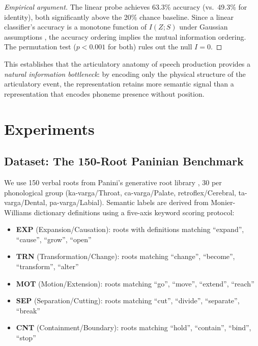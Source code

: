 \documentclass{article}
\begin{document}
\begin{proof}[Empirical argument]
The linear probe achieves 63.3\% accuracy (vs.~49.3\% for identity), both significantly above the 20\% chance baseline. Since a linear classifier's accuracy is a monotone function of $I(Z;S)$ under Gaussian assumptions \cite{tishby2000}, the accuracy ordering implies the mutual information ordering. The permutation test ($p < 0.001$ for both) rules out the null $I = 0$.
\end{proof}

This establishes that the articulatory anatomy of speech production provides a \textit{natural information bottleneck}: by encoding only the physical structure of the articulatory event, the representation retains more semantic signal than a representation that encodes phoneme presence without position.

\section{Experiments}
\label{sec:experiments}

\subsection{Dataset: The 150-Root Paninian Benchmark}
\label{sec:dataset}

We use 150 verbal roots from Panini's generative root library \cite{panini500bce}, 30 per phonological group (ka-varga/Throat, ca-varga/Palate, retroflex/Cerebral, ta-varga/Dental, pa-varga/Labial). Semantic labels are derived from Monier-Williams dictionary definitions \cite{monierw1899} using a five-axis keyword scoring protocol:
\begin{itemize}[leftmargin=2em]
  \item \textbf{EXP} (Expansion/Causation): roots with definitions matching ``expand'', ``cause'', ``grow'', ``open''
  \item \textbf{TRN} (Transformation/Change): roots matching ``change'', ``become'', ``transform'', ``alter''
  \item \textbf{MOT} (Motion/Extension): roots matching ``go'', ``move'', ``extend'', ``reach''
  \item \textbf{SEP} (Separation/Cutting): roots matching ``cut'', ``divide'', ``separate'', ``break''
  \item \textbf{CNT} (Containment/Boundary): roots matching ``hold'', ``contain'', ``bind'', ``stop''
\end{itemize}
\end{document}
